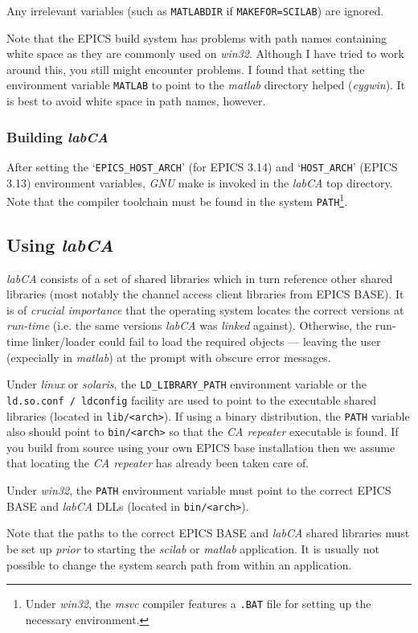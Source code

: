 \documentclass{article}
\newcommand{\sca}{\ita{labCA}}
\newcommand{\scilab}{\ita{scilab}}
\newcommand{\matlab}{\ita{matlab}}
\newcommand{\windoze}{\ita{win32}}
\newcommand{\com}[1]{{\tt #1}}
\newcommand{\pbrk}{\pagebreak[3]}
\newcommand{\ita}[1]{\emph{#1}}
\renewcommand{\pbrk}{}
\begin{document}
Any irrelevant variables (such as \com{MATLABDIR} if \com{MAKEFOR=SCILAB})
are ignored.

Note that the EPICS build system has problems with path names containing
white space as they are commonly used on \windoze. Although I have
tried to work around this, you still might encounter problems. I found
that setting the environment variable \com{MATLAB} to point to the \matlab{}
directory helped (\ita{cygwin}). It is best to avoid white space in path
names, however.

\subsubsection{Building \sca}
After setting the
`\com{EPICS\_HOST\_ARCH}' (for EPICS 3.14) and `\com{HOST\_ARCH}' (EPICS 3.13)
environment variables, \ita{GNU} make is invoked in the \sca{} top 
directory. Note that the compiler toolchain must be found in the system
\com{PATH}\footnote{
Under \windoze, the \ita{msvc} compiler features a \com{.BAT} file for
setting up the necessary environment.
}.

\pbrk
\subsection{Using \sca{}}
\sca{} consists of a set of shared libraries which in turn reference
other shared libraries (most notably the channel access client libraries
from EPICS BASE). It is of \ita{crucial importance} that the operating
system locates the correct versions at \ita{run-time} (i.e. the same versions
\sca{} was \ita{linked} against). Otherwise, the run-time linker/loader
could fail to load the required objects --- leaving the user (expecially
in \matlab) at the prompt with obscure error messages.

Under \ita{linux} or \ita{solaris}, the \com{LD\_LIBRARY\_PATH} environment
variable or the \com{ld.so.conf / ldconfig} facility are used to point
to the executable shared libraries (located in \com{lib/<arch>}).
If using a binary distribution, the \com{PATH} variable also should point
to \com{bin/<arch>} so that the \ita{CA repeater} executable is found.
If you build from source using your own EPICS base installation then
we assume that locating the \ita{CA repeater} has already been taken
care of.

Under \windoze{}, the \com{PATH} environment variable must point to the
correct EPICS BASE and \sca{} DLLs (located in \com{bin/<arch>}).

Note that the paths to the correct EPICS BASE and \sca{} shared libraries
must be set up \ita{prior} to starting the \scilab{} or \matlab{} application.
It is usually not possible to change the system search
path from within an application.
\end{document}
